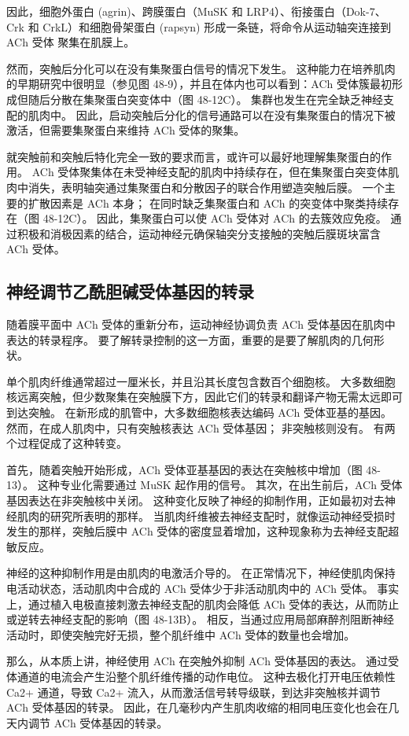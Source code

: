 因此，细胞外蛋白 (agrin)、跨膜蛋白（MuSK 和 LRP4）、衔接蛋白（Dok-7、Crk 和 CrkL）和细胞骨架蛋白 (rapsyn) 形成一条链，将命令从运动轴突连接到 ACh 受体 聚集在肌膜上。

然而，突触后分化可以在没有集聚蛋白信号的情况下发生。 这种能力在培养肌肉的早期研究中很明显（参见图 48-9），并且在体内也可以看到：ACh 受体簇最初形成但随后分散在集聚蛋白突变体中（图 48-12C）。 集群也发生在完全缺乏神经支配的肌肉中。 因此，启动突触后分化的信号通路可以在没有集聚蛋白的情况下被激活，但需要集聚蛋白来维持 ACh 受体的聚集。

就突触前和突触后特化完全一致的要求而言，或许可以最好地理解集聚蛋白的作用。 ACh 受体聚集体在未受神经支配的肌肉中持续存在，但在集聚蛋白突变体肌肉中消失，表明轴突通过集聚蛋白和分散因子的联合作用塑造突触后膜。 一个主要的扩散因素是 ACh 本身； 在同时缺乏集聚蛋白和 ACh 的突变体中聚类持续存在（图 48-12C）。 因此，集聚蛋白可以使 ACh 受体对 ACh 的去簇效应免疫。 通过积极和消极因素的结合，运动神经元确保轴突分支接触的突触后膜斑块富含 ACh 受体。

\subsection{神经调节乙酰胆碱受体基因的转录}
随着膜平面中 ACh 受体的重新分布，运动神经协调负责 ACh 受体基因在肌肉中表达的转录程序。 要了解转录控制的这一方面，重要的是要了解肌肉的几何形状。

单个肌肉纤维通常超过一厘米长，并且沿其长度包含数百个细胞核。 大多数细胞核远离突触，但少数聚集在突触膜下方，因此它们的转录和翻译产物无需太远即可到达突触。 在新形成的肌管中，大多数细胞核表达编码 ACh 受体亚基的基因。 然而，在成人肌肉中，只有突触核表达 ACh 受体基因； 非突触核则没有。 有两个过程促成了这种转变。

首先，随着突触开始形成，ACh 受体亚基基因的表达在突触核中增加（图 48-13）。 这种专业化需要通过 MuSK 起作用的信号。 其次，在出生前后，ACh 受体基因表达在非突触核中关闭。 这种变化反映了神经的抑制作用，正如最初对去神经肌肉的研究所表明的那样。 当肌肉纤维被去神经支配时，就像运动神经受损时发生的那样，突触后膜中 ACh 受体的密度显着增加，这种现象称为去神经支配超敏反应。

神经的这种抑制作用是由肌肉的电激活介导的。 在正常情况下，神经使肌肉保持电活动状态，活动肌肉中合成的 ACh 受体少于非活动肌肉中的 ACh 受体。 事实上，通过植入电极直接刺激去神经支配的肌肉会降低 ACh 受体的表达，从而防止或逆转去神经支配的影响（图 48-13B）。 相反，当通过应用局部麻醉剂阻断神经活动时，即使突触完好无损，整个肌纤维中 ACh 受体的数量也会增加。

那么，从本质上讲，神经使用 ACh 在突触外抑制 ACh 受体基因的表达。 通过受体通道的电流会产生沿整个肌纤维传播的动作电位。 这种去极化打开电压依赖性 Ca2+ 通道，导致 Ca2+ 流入，从而激活信号转导级联，到达非突触核并调节 ACh 受体基因的转录。 因此，在几毫秒内产生肌肉收缩的相同电压变化也会在几天内调节 ACh 受体基因的转录。

